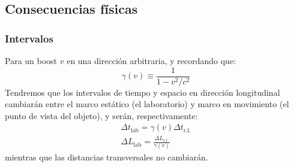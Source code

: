 \documentclass[]{article}
\numberwithin{equation}{section}
\begin{document}
\subsection{Consecuencias físicas}
\subsubsection{Intervalos}
Para un boost \(v\) en una dirección arbitraria, y recordando que:
\begin{equation*}
	\gamma(v) \equiv \frac{1}{1-v^2/c^2}
\end{equation*}
Tendremos que los intervalos de tiempo y espacio en dirección longitudinal cambiarán entre el marco estático (el laboratorio) y marco en movimiento (el punto de vista del objeto), y serán, respectivamente:
\begin{align}
	\Delta t_{\text{lab}} = \gamma(v)\Delta t_{\text{r.f.}}\\
	\Delta L_{\text{lab}} = \frac{\Delta L_{\text{r.f.}}}{\gamma(v)}
\end{align}
mientras que las distancias transversales no cambiarán.
\end{document}
